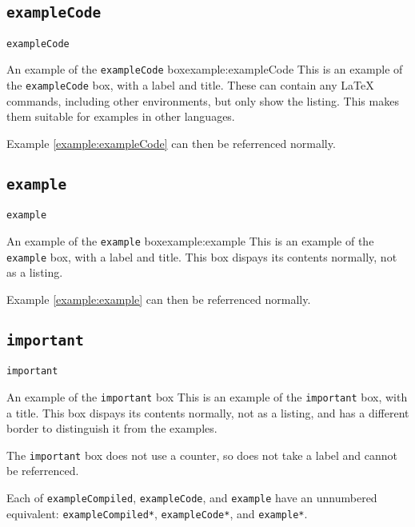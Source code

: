\documentclass{article}
\begin{document}
\subsection*{\texttt{exampleCode}}
\begin{exampleCompiled*}{\texttt{exampleCode}}
\begin{exampleCode}{An example of the \texttt{exampleCode} box}{example:exampleCode}
This is an example of the \texttt{exampleCode} box, with a label and title. These can contain any \LaTeX{} commands, including other environments, but only show the listing. This makes them suitable for examples in other languages.
\end{exampleCode}
Example \ref{example:exampleCode} can then be referrenced normally.
\end{exampleCompiled*}

\subsection*{\texttt{example}}
\begin{exampleCompiled*}{\texttt{example}}
\begin{example}{An example of the \texttt{example} box}{example:example}
This is an example of the \texttt{example} box, with a label and title. This box dispays its contents normally, not as a listing.
\end{example}
Example \ref{example:example} can then be referrenced normally.
\end{exampleCompiled*}

\subsection*{\texttt{important}}
\begin{exampleCompiled*}{\texttt{important}}
\begin{important}{An example of the \texttt{important} box}
This is an example of the \texttt{important} box, with a title. This box dispays its contents normally, not as a listing, and has a different border to distinguish it from the examples.
\end{important}
The \texttt{important} box does not use a counter, so does not take a label and cannot be referrenced.
\end{exampleCompiled*}

Each of \lstinline|exampleCompiled|, \lstinline|exampleCode|, and \lstinline|example| have an unnumbered equivalent: \lstinline|exampleCompiled*|, \lstinline|exampleCode*|, and \lstinline|example*|.
\end{document}
